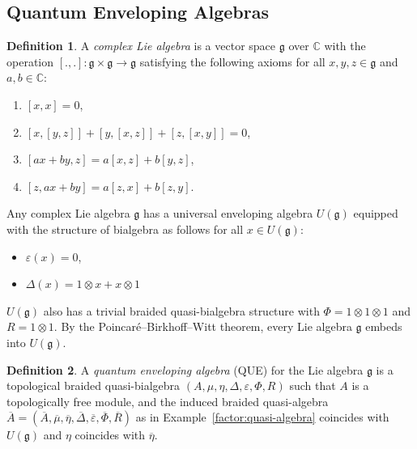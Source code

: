\documentclass[8pt]{article}
\theoremstyle{definition}
\newtheorem{definition}{Definition}[section]
\theoremstyle{definition}
\theoremstyle{definition}
\theoremstyle{definition}
\theoremstyle{definition}
\theoremstyle{definition}
\theoremstyle{definition}
\theoremstyle{definition}
\theoremstyle{definition}
\theoremstyle{definition}
\theoremstyle{definition}
\theoremstyle{definition}
\theoremstyle{definition}
\theoremstyle{definition}
\theoremstyle{question}
\begin{document}
\subsection{Quantum Enveloping Algebras}

\begin{definition}
  A \emph{complex Lie algebra} is a vector space $\mathfrak{g}$ over $\mathbb{C}$ with the operation $[.,.] : \mathfrak{g} \times \mathfrak{g} \to \mathfrak{g}$
  satisfying the following axioms for all $x, y, z \in \mathfrak{g}$ and $a, b \in \mathbb{C}$:
  \begin{enumerate}
    \item $[x,x] = 0$,
    \item $[x, [y,z]] + [y,[x,z]] + [z, [x,y]] = 0$,
    \item $[ax + by, z] = a[x,z] + b[y,z]$,
    \item $[z, ax + by]= a[z,x] + b[z,y]$.
  \end{enumerate}
\end{definition}

Any complex Lie algebra $\mathfrak{g}$ has a universal enveloping algebra $U(\mathfrak{g})$ equipped with the structure of bialgebra as follows
for all $x \in U(\mathfrak{g})$:
\begin{itemize}
  \item $\varepsilon(x) = 0$,
  \item $\Delta(x) = 1 \otimes x + x \otimes 1$
\end{itemize}
$U(\mathfrak{g})$ also has a trivial braided quasi-bialgebra structure with $\Phi = 1 \otimes 1 \otimes 1$ and $R = 1 \otimes 1$. 
By the Poincaré–Birkhoff–Witt theorem, every Lie algebra $\mathfrak{g}$ embeds into $U(\mathfrak{g})$.

\begin{definition}
  A \emph{quantum enveloping algebra} (QUE) for the Lie algebra $\mathfrak{g}$ is a topological braided quasi-bialgebra
  $(A, \mu, \eta, \Delta, \varepsilon, \Phi, R)$ such that $A$ is a topologically free module,
  and the induced braided quasi-algebra $\overline{A} = (\overline{A}, \overline{\mu}, \overline{\eta}, \overline{\Delta}, \overline{\varepsilon}, \overline{\Phi}, \overline{R})$
  as in Example~\ref{factor:quasi-algebra} coincides with $U(\mathfrak{g})$ and $\eta$ coincides with $\overline{\eta}$.
\end{definition}
\end{document}
